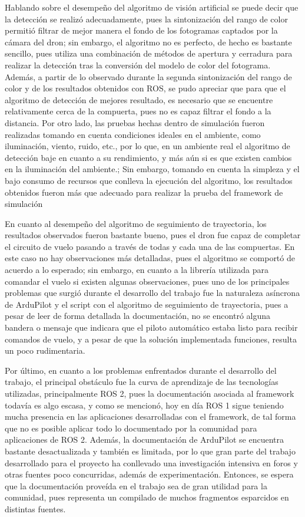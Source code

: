 Hablando sobre el desempeño del algoritmo de visión artificial se puede decir que la detección se realizó adecuadamente, pues la sintonización del rango de color permitió filtrar de mejor manera el fondo de los fotogramas captados por la cámara del dron; sin embargo, el algoritmo no es perfecto, de hecho es bastante sencillo, pues utiliza una combinación de métodos de apertura y cerradura para realizar la detección tras la conversión del modelo de color del fotograma. Además, a partir de lo observado durante la segunda sintonización del rango de color y de los resultados obtenidos con ROS, se pudo apreciar que para que el algoritmo de detección de mejores resultado, es necesario que se encuentre relativamente cerca de la compuerta, pues no es capaz filtrar el fondo a la distancia. Por otro lado, las pruebas hechas dentro de simulación fueron realizadas tomando en cuenta condiciones ideales en el ambiente, como iluminación, viento, ruido, etc., por lo que, en un ambiente real el algoritmo de detección baje en cuanto a su rendimiento, y más aún si es que existen cambios en la iluminación del ambiente.; Sin embargo, tomando en cuenta la simpleza y el bajo consumo de recursos que conlleva la ejecución del algoritmo, los resultados obtenidos fueron más que adecuado para realizar la prueba del framework de simulación 

En cuanto al desempeño del algoritmo de seguimiento de trayectoria, los resultados observados fueron bastante bueno, pues el dron fue capaz de completar el circuito de vuelo pasando a través de todas y cada una de las compuertas. En este caso no hay observaciones más detalladas, pues el algoritmo se comportó de acuerdo a lo esperado; sin embargo, en cuanto a la librería utilizada para comandar el vuelo si existen algunas observaciones, pues uno de los principales problemas que surgió durante el desarrollo del trabajo fue la naturaleza asíncrona de ArduPilot y el script con el algoritmo de seguimiento de trayectoria, pues a pesar de leer de forma detallada la documentación, no se encontró alguna bandera o mensaje que indicara que el piloto automático estaba listo para recibir comandos de vuelo, y a pesar de que la solución implementada funciones, resulta un poco rudimentaria.

Por último, en cuanto a los problemas enfrentados durante el desarrollo del trabajo, el principal obstáculo fue la curva de aprendizaje de las tecnologías utilizadas, principalmente ROS 2, pues la documentación asociada al framework todavía es algo escasa, y como se mencionó, hoy en día ROS 1 sigue teniendo mucha presencia en las aplicaciones desarrolladas con el framework, de tal forma que no es posible aplicar todo lo documentado por la comunidad para aplicaciones de ROS 2. Además, la documentación de ArduPilot se encuentra bastante desactualizada y también es limitada, por lo que gran parte del trabajo desarrollado para el proyecto ha conllevado una investigación intensiva en foros y otras fuentes poco concurridas, además de experimentación. Entonces, se espera que la documentación proveída en el trabajo sea de gran utilidad para la comunidad, pues representa un compilado de muchos fragmentos esparcidos en distintas fuentes.

